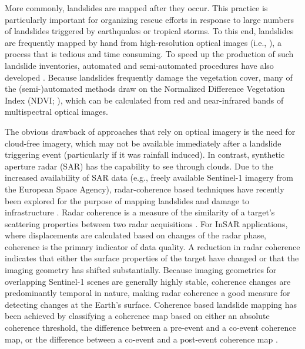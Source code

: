 \documentclass[journal abbreviation, manuscript]{copernicus}
\begin{document}
 More commonly, landslides are mapped after they occur. This practice is particularly important for organizing rescue efforts in response to large numbers of landslides triggered by earthquakes or tropical storms. To this end, landslides are frequently mapped by hand from high-resolution optical images (i.e., \cite{roback2018}), a process that is tedious and time consuming. To speed up the production of such landslide inventories, automated and semi-automated procedures have also developed \citep{mondini2011}. Because landslides frequently damage the vegetation cover, many of the (semi-)automated methods draw on the Normalized Difference Vegetation Index (NDVI; \cite{tucker1979, Rosenthal1985}), which can be calculated from red and near-infrared bands of multispectral optical images.  \par
 
The obvious drawback of approaches that rely on optical imagery is the need for cloud-free imagery, which may not be available immediately after a landslide triggering event (particularly if it was rainfall induced). In contrast, synthetic aperture radar (SAR) has the capability to see through clouds. Due to the increased availability of SAR data (e.g., freely available Sentinel-1 imagery from the European Space Agency), radar-coherence based techniques have recently been explored for the purpose of mapping landslides and damage to infrastructure \citep{Burrows2019, Yun2015}. Radar coherence is a measure of the similarity of a target's scattering properties between two radar acquisitions \citep{zebker1992}. For InSAR applications, where displacements are calculated based on changes of the radar phase, coherence is the primary indicator of data quality. A reduction in radar coherence indicates that either the surface properties of the target have changed or that the imaging geometry has shifted substantially. Because imaging geometries for overlapping Sentinel-1 scenes are generally highly stable, coherence changes are predominantly temporal in nature, making radar coherence a good measure for detecting changes at the Earth's surface. Coherence based landslide mapping has been achieved by classifying a coherence map based on either an absolute coherence threshold, the difference between a pre-event and a co-event coherence map, or the difference between a co-event and a post-event coherence map \citep{Burrows2019, Yun2015}. \par 
\end{document}
